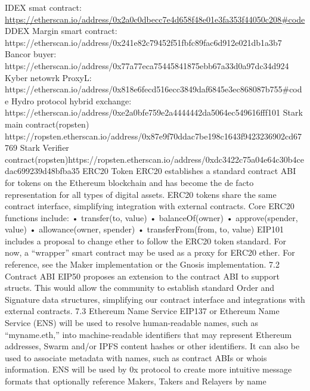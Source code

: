 \documentclass{article}
\begin{document}
IDEX smat contract:
\hyperlink{https://etherscan.io/address/0x2a0c0dbecc7e4d658f48e01e3fa353f44050c208#code}{https://etherscan.io/address/0x2a0c0dbecc7e4d658f48e01e3fa353f44050c208#code}
DDEX Margin smart contract: https://etherscan.io/address/0x241e82c79452f51fbfc89fac6d912e021db1a3b7
Bancor buyer: https://etherscan.io/address/0x77a77eca75445841875ebb67a33d0a97dc34d924
Kyber netowrk ProxyL: https://etherscan.io/address/0x818e6fecd516ecc3849daf6845e3ec868087b755#code
Hydro protocol hybrid exchange: https://etherscan.io/address/0xe2a0bfe759e2a4444442da5064ec549616fff101
Stark main contract(ropsten) https://ropsten.etherscan.io/address/0x87e9f70ddac7be198c1643f9423236902cd67769
Stark Verifier contract(ropsten)https://ropsten.etherscan.io/address/0xdc3422c75a04e64c30b4cedac699239d48bfba35
ERC20 Token
ERC20 establishes a standard contract ABI for tokens on the Ethereum blockchain and has become the
de facto representation for all types of digital assets. ERC20 tokens share the same contract interface,
simplifying integration with external contracts.
Core ERC20 functions include:
• transfer(to, value)
• balanceOf(owner)
• approve(spender, value)
• allowance(owner, spender)
• transferFrom(from, to, value)
EIP101 includes a proposal to change ether to follow the ERC20 token standard. For now, a “wrapper”
smart contract may be used as a proxy for ERC20 ether. For reference, see the Maker implementation
or the Gnosis implementation.
7.2 Contract ABI
EIP50 proposes an extension to the contract ABI to support structs. This would allow the community to establish standard Order and Signature data structures, simplifying our contract interface and
integrations with external contracts.
7.3 Ethereum Name Service
EIP137 or Ethereum Name Service (ENS) will be used to resolve human-readable names, such as “myname.eth,” into machine-readable identifiers that may represent Ethereum addresses, Swarm and/or
IPFS content hashes or other identifiers. It can also be used to associate metadata with names, such as
contract ABIs or whois information. ENS will be used by 0x protocol to create more intuitive message
formats that optionally reference Makers, Takers and Relayers by name


\end{document}
